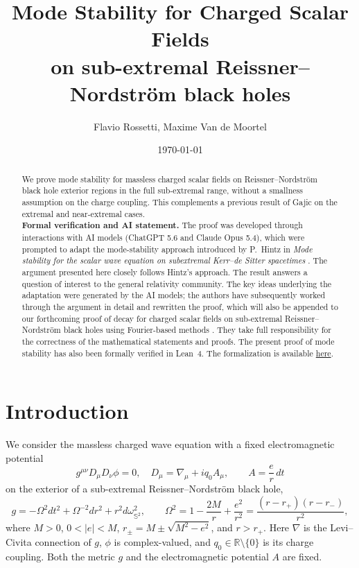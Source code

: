 \documentclass[11pt]{article}
\title{Mode Stability for Charged Scalar Fields \\on  sub-extremal Reissner--Nordstr\"om black holes}
\author{Flavio Rossetti, Maxime Van de Moortel}
\date{\today}
\numberwithin{equation}{section}
\begin{document}
	\maketitle
	
	\begin{abstract}	
		We prove mode stability for massless charged scalar fields on 
		Reissner--Nordstr\"om black hole exterior regions in the full sub-extremal range, without  a smallness assumption on the charge coupling. This complements a previous result of Gajic on the extremal and near-extremal cases.\\
		
		\noindent\textbf{Formal verification and AI statement.}
		The proof was developed through interactions with AI models
		(ChatGPT 5.6 and Claude Opus 5.4), which were prompted to adapt
		the mode-stability approach introduced by P.~Hintz in
		\emph{Mode stability for the scalar wave equation on subextremal
			Kerr--de Sitter spacetimes} \cite{HintzKdS2026}. The argument presented here closely
		follows Hintz's approach.	The result answers a question of interest to the general relativity
		community. The key ideas underlying the adaptation were generated
		by the AI models; the authors have subsequently worked through
		the argument in detail and rewritten the proof, which will also be appended to our forthcoming proof of decay for charged scalar fields on  sub-extremal Reissner--Nordstr\"om black holes using Fourier-based methods \cite{RVdM}.	They take full responsibility for the correctness of the mathematical statements and
		proofs.		The present proof of mode stability has also been formally verified in Lean~4.
		The formalization is available \href{https://github.com/maxvdmmath/charged_scalar_field_mode_stability}{here}.
	\end{abstract}
	
	
	
	
	\section*{Introduction}
	
	We consider the massless charged wave equation with a fixed electromagnetic potential
	\begin{equation} \label{wave_eqn}
		g^{\mu\nu}D_\mu D_\nu\phi=0,\quad D_\mu=\nabla_\mu+iq_0A_\mu,
		\qquad A=\frac{e}{r}\,dt
	\end{equation}
	on the exterior of a sub-extremal Reissner--Nordstr\"om black hole,
	\begin{equation} \label{RN_metric}
		g=-\Omega^2dt^2+\Omega^{-2}dr^2+r^2d\omega_{\mathbb S^2}^2,
		\qquad
		\Omega^2=1-\frac{2M}{r}+\frac{e^2}{r^2}
		=\frac{(r-r_+)(r-r_-)}{r^2},
	\end{equation}
	where $M>0$, $0 < |e|<M$, $r_\pm=M\pm\sqrt{M^2-e^2}$, and $r>r_+$.
	Here $\nabla$ is the Levi--Civita connection of $g$, $\phi$ is complex-valued,
	and $q_0\in\mathbb R \setminus \{ 0 \}$ is its charge coupling. Both the metric $g$ and
	the electromagnetic potential $A$ are fixed. 
	
\end{document}
